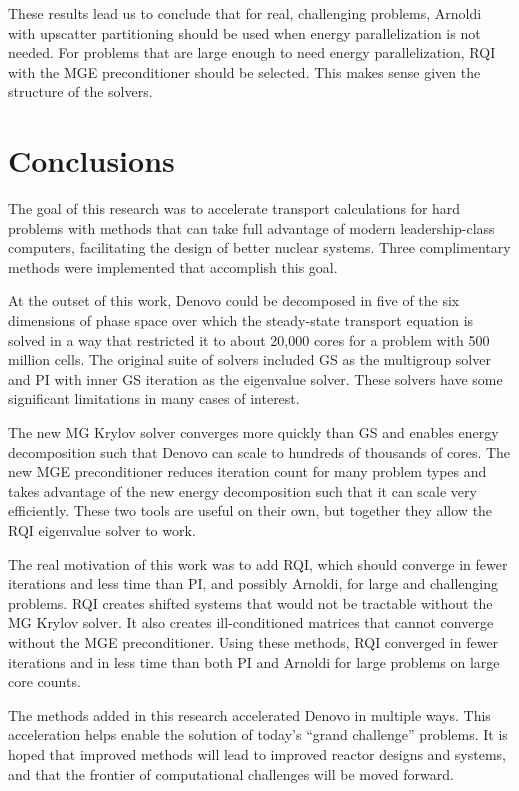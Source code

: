 \documentclass{article}                                                                           %
\begin{document}
These results lead us to conclude that for real, challenging problems, Arnoldi with upscatter partitioning should be used when energy parallelization is not needed. For problems that are large enough to need energy parallelization, RQI with the MGE preconditioner should be selected. This makes sense given the structure of the solvers.


\section{Conclusions}
\label{sec:conclusions}
The goal of this research was to accelerate transport calculations for hard problems with methods that can take full advantage of modern leadership-class computers, facilitating the design of better nuclear systems. Three complimentary methods were implemented that accomplish this goal. 

At the outset of this work, Denovo could be decomposed in five of the six dimensions of phase space over which the steady-state transport equation is solved in a way that restricted it to about 20,000 cores for a problem with 500 million cells. The original suite of solvers included GS as the multigroup solver and PI with inner GS iteration as the eigenvalue solver. These solvers have some significant limitations in many cases of interest. 

The new MG Krylov solver converges more quickly than GS and enables energy decomposition such that Denovo can scale to hundreds of thousands of cores. The new MGE preconditioner reduces iteration count for many problem types and takes advantage of the new energy decomposition such that it can scale very efficiently. These two tools are useful on their own, but together they allow the RQI eigenvalue solver to work.

The real motivation of this work was to add RQI, which should converge in fewer iterations and less time than PI, and possibly Arnoldi, for large and challenging problems. RQI creates shifted systems that would not be tractable without the MG Krylov solver. It also creates ill-conditioned matrices that cannot converge without the MGE preconditioner. Using these methods, RQI converged in fewer iterations and in less time than both PI and Arnoldi for large problems on large core counts. 

The methods added in this research accelerated Denovo in multiple ways. This acceleration helps enable the solution of today's ``grand challenge'' problems. It is hoped that improved methods will lead to improved reactor designs and systems, and that the frontier of computational challenges will be moved forward.
\end{document}
